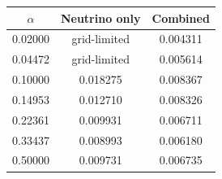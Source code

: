 \begin{tabular}{ccc}
\hline\hline
$\alpha$ & Neutrino only & Combined \\
\hline
0.02000 & grid-limited & 0.004311 \\
0.04472 & grid-limited & 0.005614 \\
0.10000 & 0.018275 & 0.008367 \\
0.14953 & 0.012710 & 0.008326 \\
0.22361 & 0.009931 & 0.006711 \\
0.33437 & 0.008993 & 0.006180 \\
0.50000 & 0.009731 & 0.006735 \\
\hline\hline
\end{tabular}
